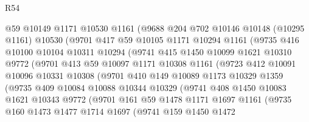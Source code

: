 \begin{lexlean}{R54}
\begin{coremodule}
              @59
              @10149
              @1171
              @10530
              @1161
              (@9688
                @204
                @702
                @10146
                @10148
                (@10295 @1161)
                @10530
                (@9701
                  @417
                  @59
                  @10105
                  @1171
                  @10294
                  @1161
                  (@9735
                    @416
                    @10100
                    @10104
                    @10311
                    @10294
                    (@9741
                      @415
                      @1450
                      @10099
                      @1621
                      @10310
                      @9772
                      (@9701
                        @413
                        @59
                        @10097
                        @1171
                        @10308
                        @1161
                        (@9723
                          @412
                          @10091
                          @10096
                          @10331
                          @10308
                          (@9701
                            @410
                            @149
                            @10089
                            @1173
                            @10329
                            @1359
                            (@9735
                              @409
                              @10084
                              @10088
                              @10344
                              @10329
                              (@9741
                                @408
                                @1450
                                @10083
                                @1621
                                @10343
                                @9772
                                (@9701
                                  @161
                                  @59
                                  @1478
                                  @1171
                                  @1697
                                  @1161
                                  (@9735
                                    @160
                                    @1473
                                    @1477
                                    @1714
                                    @1697
                                    (@9741
                                      @159
                                      @1450
                                      @1472

\end{coremodule}
\end{lexlean}
